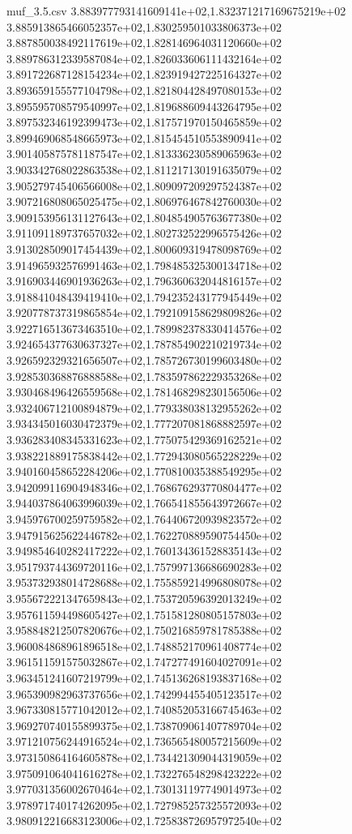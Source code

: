 \begin{filecontents*}{muf_3.5.csv}
3.883977793141609141e+02,1.832371217169675219e+02
3.885913865466052357e+02,1.830259501033806373e+02
3.887850038492117619e+02,1.828146964031120660e+02
3.889786312339587084e+02,1.826033606111432164e+02
3.891722687128154234e+02,1.823919427225164327e+02
3.893659155577104798e+02,1.821804428497080153e+02
3.895595708579540997e+02,1.819688609443264795e+02
3.897532346192399473e+02,1.817571970150465859e+02
3.899469068548665973e+02,1.815454510553890941e+02
3.901405875781187547e+02,1.813336230589065963e+02
3.903342768022863538e+02,1.811217130191635079e+02
3.905279745406566008e+02,1.809097209297524387e+02
3.907216808065025475e+02,1.806976467842760030e+02
3.909153956131127643e+02,1.804854905763677380e+02
3.911091189737657032e+02,1.802732522996575426e+02
3.913028509017454439e+02,1.800609319478098769e+02
3.914965932576991463e+02,1.798485325300134718e+02
3.916903446901936263e+02,1.796360632044816157e+02
3.918841048439419410e+02,1.794235243177945449e+02
3.920778737319865854e+02,1.792109158629809826e+02
3.922716513673463510e+02,1.789982378330414576e+02
3.924654377630637327e+02,1.787854902210219734e+02
3.926592329321656507e+02,1.785726730199603480e+02
3.928530368876888588e+02,1.783597862229353268e+02
3.930468496426559568e+02,1.781468298230156506e+02
3.932406712100894879e+02,1.779338038132955262e+02
3.934345016030472379e+02,1.777207081868882597e+02
3.936283408345331623e+02,1.775075429369162521e+02
3.938221889175838442e+02,1.772943080565228229e+02
3.940160458652284206e+02,1.770810035388549295e+02
3.942099116904948346e+02,1.768676293770804477e+02
3.944037864063996039e+02,1.766541855643972667e+02
3.945976700259759582e+02,1.764406720939823572e+02
3.947915625622446782e+02,1.762270889590754450e+02
3.949854640282417222e+02,1.760134361528835143e+02
3.951793744369720116e+02,1.757997136686690283e+02
3.953732938014728688e+02,1.755859214996808078e+02
3.955672221347659843e+02,1.753720596392013249e+02
3.957611594498605427e+02,1.751581280805157803e+02
3.958848212507820676e+02,1.750216859781785388e+02
3.960084868961896518e+02,1.748852170961408774e+02
3.961511591575032867e+02,1.747277491604027091e+02
3.963451241607219799e+02,1.745136268193837168e+02
3.965390982963737656e+02,1.742994455405123517e+02
3.967330815771042012e+02,1.740852053166745463e+02
3.969270740155899375e+02,1.738709061407789704e+02
3.971210756244916524e+02,1.736565480057215609e+02
3.973150864164605878e+02,1.734421309044319059e+02
3.975091064041616278e+02,1.732276548298423222e+02
3.977031356002670464e+02,1.730131197749014973e+02
3.978971740174262095e+02,1.727985257325572093e+02
3.980912216683123006e+02,1.725838726957972540e+02

\end{filecontents*}
